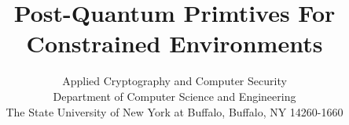 \documentclass[conference]{IEEEtran}
\begin{document}
%
\title{Post-Quantum Primtives For Constrained Environments}




% 
\author{
Applied Cryptography and Computer Security\\
Department of Computer Science and Engineering\\
The State University of New York at Buffalo,
Buffalo, NY 14260-1660\\
}
\end{document}
